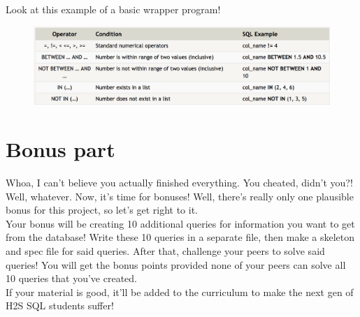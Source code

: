 \documentclass{42-en}
\begin{document}
	Look at this example of a basic wrapper program! \\ 

	\begin{figure}[H]
		\begin{center}
			\includegraphics[width=14cm]{operators.png}
		\end{center}
	\end{figure}

\nextexercice


\chapter{Bonus part}

	Whoa, I can't believe you actually finished everything. You cheated, didn't you?! 
	Well, whatever. Now, it's time for bonuses! Well, there's really only one 
	plausible bonus for this project, so let's get right to it. \\ 

	Your bonus will be creating 10 additional queries for information you want 
	to get from the database! Write these 10 queries in a separate file, 
	then make a skeleton and spec file for said queries. After that, challenge 
	your peers to solve said queries! You will get the bonus points provided 
	none of your peers can solve all 10 queries that you've created. \\ 

	If your material is good, it'll be added to the curriculum to make the 
	next gen of H2S SQL students suffer! 

\end{document}
